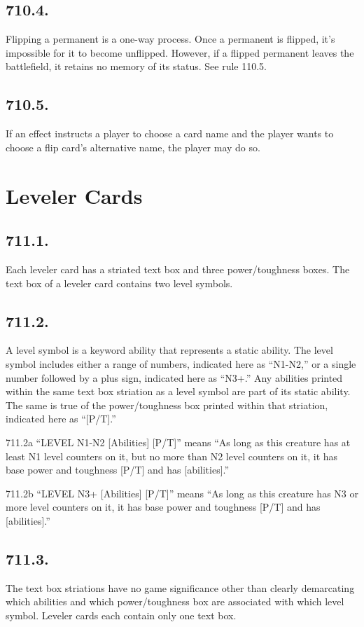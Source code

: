 \subsection*{710.4.}
Flipping a permanent is a one-way process. Once a permanent is flipped, it’s impossible for it to become unflipped. However, if a flipped permanent leaves the battlefield, it retains no memory of its status. See rule 110.5.

\subsection*{710.5.}
If an effect instructs a player to choose a card name and the player wants to choose a flip card’s alternative name, the player may do so.

\section{Leveler Cards}
\subsection*{711.1.}
Each leveler card has a striated text box and three power/toughness boxes. The text box of a leveler card contains two level symbols.

\subsection*{711.2.}
A level symbol is a keyword ability that represents a static ability. The level symbol includes either a range of numbers, indicated here as “N1-N2,” or a single number followed by a plus sign, indicated here as “N3+.” Any abilities printed within the same text box striation as a level symbol are part of its static ability. The same is true of the power/toughness box printed within that striation, indicated here as “[P/T].”

711.2a “{LEVEL N1-N2} [Abilities] [P/T]” means “As long as this creature has at least N1 level counters on it, but no more than N2 level counters on it, it has base power and toughness [P/T] and has [abilities].”

711.2b “{LEVEL N3+} [Abilities] [P/T]” means “As long as this creature has N3 or more level counters on it, it has base power and toughness [P/T] and has [abilities].”

\subsection*{711.3.}
The text box striations have no game significance other than clearly demarcating which abilities and which power/toughness box are associated with which level symbol. Leveler cards each contain only one text box.

